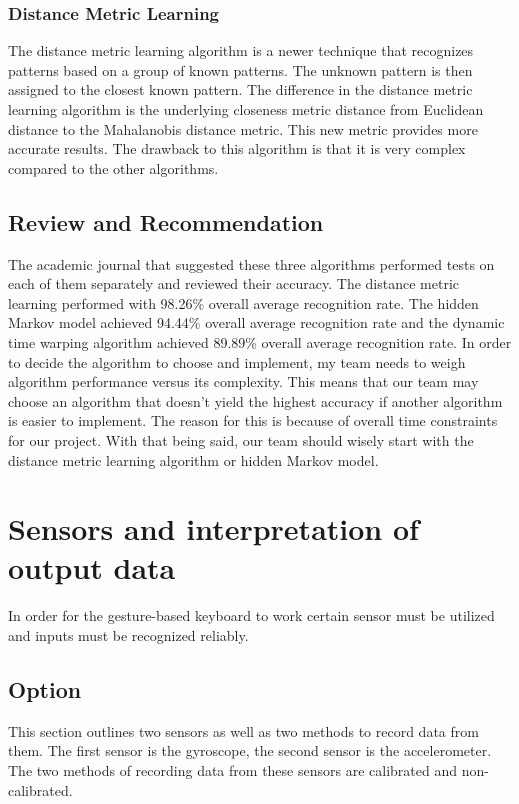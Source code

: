 \documentclass[onecolumn, draftclsnofoot,10pt, journal, letterpaper]{IEEEtran}
\begin{document}
        \subsubsection{Distance Metric Learning}
            The distance metric learning algorithm is a newer technique that recognizes patterns based on a group of known patterns. The unknown pattern is then assigned to the closest known pattern. The difference in the distance metric learning algorithm is the underlying closeness metric distance from Euclidean distance to the Mahalanobis distance metric. This new metric provides more accurate results. The drawback to this algorithm is that it is very complex compared to the other algorithms. 
    
    \subsection{Review and Recommendation}
        The academic journal that suggested these three algorithms performed tests on each of them separately and reviewed their accuracy. The distance metric learning performed with 98.26\% overall average recognition rate. The hidden Markov model achieved 94.44\% overall average recognition rate and the dynamic time warping algorithm achieved 89.89\% overall average recognition rate. In order to decide the algorithm to choose and implement, my team needs to weigh algorithm performance versus its complexity. This means that our team may choose an algorithm that doesn't yield the highest accuracy if another algorithm is easier to implement. The reason for this is because of overall time constraints for our project. With that being said, our team should wisely start with the distance metric learning algorithm or hidden Markov model.

\section{Sensors and interpretation of output data}
    In order for the gesture-based keyboard to work certain sensor must be utilized and inputs must be recognized reliably.
    \subsection{Option}
        This section outlines two sensors as well as two methods to record data from them. The first sensor is the gyroscope, the second sensor is the accelerometer. The two methods of recording data from these sensors are calibrated and non-calibrated. 
\end{document}
